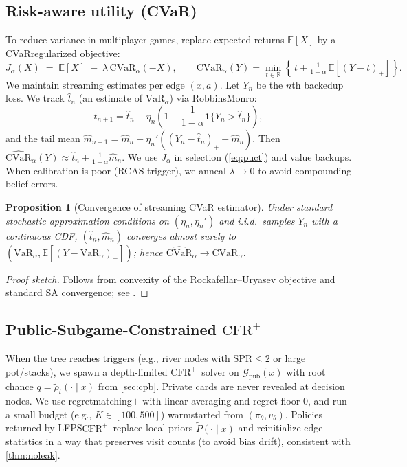 \documentclass[10pt]{article}
\newcommand{\CFRplus}{\ensuremath{\mathrm{CFR}^{+}}\xspace}
\newcommand{\E}{\mathbb{E}}
\newcommand{\CVaR}{\mathrm{CVaR}}
\newcommand{\VaR}{\mathrm{VaR}}
\newcommand{\1}{\mathbf{1}}
\newcommand{\R}{\mathbb{R}}
\theoremstyle{plain}
\newtheorem{proposition}{Proposition}
\begin{document}
\subsection{Risk-aware utility (CVaR)}
To reduce variance in multi\textendash player games, replace expected returns $\E[X]$ by a CVaR\textendash regularized objective:
\begin{equation}
\label{eq:cvar}
J_\alpha(X) \;=\; \E[X] \;-\; \lambda\,\CVaR_\alpha(-X), \qquad
\CVaR_\alpha(Y)=\min_{t\in\R}\left\{\, t + \tfrac{1}{1-\alpha}\,\E[(Y-t)_+] \right\}.
\end{equation}
We maintain streaming estimates per edge $(x,a)$. Let $Y_n$ be the $n$th backed\textendash up loss. We track $\widehat t_n$ (an estimate of $\VaR_\alpha$) via Robbins\textendash Monro:
\[
\widehat t_{n+1}=\widehat t_n-\eta_n\!\left(1-\frac{1}{1-\alpha}\1\{Y_n>\widehat t_n\}\right),
\]
and the tail mean $\widehat m_{n+1} = \widehat m_n + \eta_n'\!\left((Y_n-\widehat t_n)_+ - \widehat m_n\right)$. Then $\widehat{\CVaR}_\alpha(Y)\approx \widehat t_n + \frac{1}{1-\alpha}\widehat m_n$. We use $J_\alpha$ in selection (\cref{eq:puct}) and value backups. When calibration is poor (RCAS trigger), we anneal $\lambda\!\to\!0$ to avoid compounding belief errors.
\begin{proposition}[Convergence of streaming CVaR estimator]
Under standard stochastic approximation conditions on $(\eta_n,\eta_n')$ and i.i.d.\ samples $Y_n$ with a continuous CDF, $(\widehat t_n,\widehat m_n)$ converges almost surely to $(\VaR_\alpha,\E[(Y-\VaR_\alpha)_+])$; hence $\widehat{\CVaR}_\alpha\to \CVaR_\alpha$. 
\end{proposition}
\begin{proof}[Proof sketch]
Follows from convexity of the Rockafellar–Uryasev objective and standard SA convergence; see \citet{rockafellar2000cvar}.
\end{proof}

\subsection{Public-Subgame-Constrained \CFRplus}
When the tree reaches triggers (e.g., river nodes with $\mathrm{SPR} \le 2$ or large pot/stacks), we spawn a depth-limited \CFRplus\ solver on $\mathcal{G}_{\text{pub}}(x)$ with root chance $q=\tilde\rho_t(\cdot\mid x)$ from \cref{sec:cpb}. Private cards are never revealed at decision nodes. We use regret\textendash matching$+$ with linear averaging and regret floor $0$, and run a small budget (e.g., $K\in[100,500]$) warm\textendash started from $(\pi_\theta,v_\theta)$. Policies returned by LF\textendash PS\textendash \CFRplus\ replace local priors $\tilde P(\cdot\mid x)$ and reinitialize edge statistics in a way that preserves visit counts (to avoid bias drift), consistent with \cref{thm:noleak}.
\end{document}
